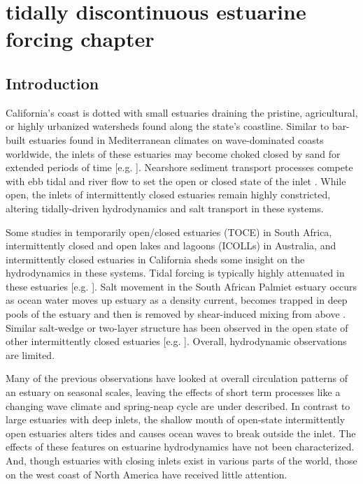 \chapter{tidally discontinuous estuarine forcing chapter}
\label{chTidallyDiscontHydrodynamics}





\section{Introduction}

California's coast is dotted with small estuaries draining the pristine,
agricultural, or highly urbanized watersheds found along the state's
coastline. Similar to bar-built estuaries found in Mediterranean climates
on wave-dominated coasts worldwide, the inlets of these estuaries
may become choked closed by sand for extended periods of time {[}e.g.
\citealp{elwany_etal_1998,hanes_etal_2011,fortunato_etal_2014,ranasinghe_pattiaratchi_2003}{]}.
Nearshore sediment transport processes compete with ebb tidal and
river flow to set the open or closed state of the inlet \citep{behrens_etal_2013}.
While open, the inlets of intermittently closed estuaries remain highly
constricted, altering tidally-driven hydrodynamics and salt transport
in these systems.

Some studies in temporarily open/closed estuaries (TOCE) in South
Africa, intermittently closed and open lakes and lagoons (ICOLLs)
in Australia, and intermittently closed estuaries in California sheds
some insight on the hydrodynamics in these systems. Tidal forcing
is typically highly attenuated in these estuaries {[}e.g. \citealp{ranasinghe_pattiaratchi_1999,gale_etal_2007}{]}.
Salt movement in the South African Palmiet estuary occurs as ocean
water moves up estuary as a density current, becomes trapped in deep
pools of the estuary and then is removed by shear-induced mixing from
above \citep{largier_and_taljaard_1991}. Similar salt-wedge or two-layer
structure has been observed in the open state of other intermittently
closed estuaries {[}e.g. \citealp{sharples_etal_2003}{]}. Overall,
hydrodynamic observations are limited.

Many of the previous observations have looked at overall circulation
patterns of an estuary on seasonal scales, leaving the effects of
short term processes like a changing wave climate and spring-neap
cycle are under described. In contrast to large estuaries with deep
inlets, the shallow mouth of open-state intermittently open estuaries
alters tides and causes ocean waves to break outside the inlet. The
effects of these features on estuarine hydrodynamics have not been
characterized. And, though estuaries with closing inlets exist in
various parts of the world, those on the west coast of North America
have received little attention. 

